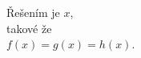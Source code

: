 \documentclass[preview]{standalone}
\begin{document}
\begin{center}
Řešením je $x$,\\ takové že\\ $f(x)=g(x)=h(x)$.
\end{center}
\end{document}
